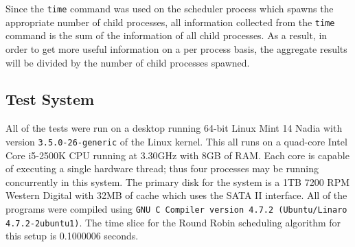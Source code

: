 Since the \texttt{time} command was used on the scheduler process which spawns the  appropriate number of child processes, all information collected from the \texttt{time} command is the sum of the information of all child processes.  As a result, in order to get more useful information on a per process basis, the aggregate results will be divided by the number of child processes spawned.

\subsection{Test System}

All of the tests were run on a desktop running 64-bit Linux Mint 14 Nadia with version \texttt{3.5.0-26-generic} of the Linux kernel.  This all runs on a quad-core Intel Core i5-2500K CPU running at 3.30GHz with 8GB of RAM.  Each core is capable of executing a single hardware thread; thus four processes may be running concurrently in this system.  The primary disk for the system is a 1TB 7200 RPM Western Digital with 32MB of cache which uses the SATA II interface.  All of the programs were compiled using \texttt{GNU C Compiler version 4.7.2 (Ubuntu/Linaro 4.7.2-2ubuntu1)}.  The time slice for the Round Robin scheduling algorithm for this setup is 0.1000006 seconds.
